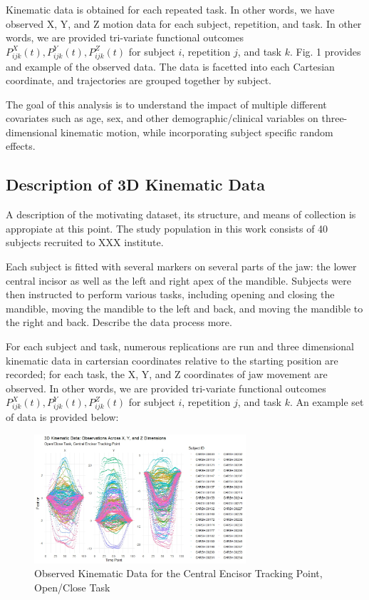 \documentclass[AMA,Times1COL]{WileyNJDv5} %
\begin{document}
Kinematic data is obtained for each repeated task.  In other words, we have observed X, Y, and Z motion data for each subject, repetition, and task.  In other words, we are provided tri-variate functional outcomes \(P_{ijk}^X(t), P_{ijk}^Y(t), P_{ijk}^Z(t)\) for subject \(i\), repetition \(j\), and task \(k\).  Fig. 1 provides and example of the observed data.  The data is facetted into each Cartesian coordinate, and trajectories are grouped together by subject.  

The goal of this analysis is to understand the impact of multiple different covariates such as age, sex, and other demographic/clinical variables on three-dimensional kinematic motion, while incorporating subject specific random effects. 

\subsection{Description of 3D Kinematic Data}

A description of the motivating dataset, its structure, and means of collection is appropiate at this point.  The study population in this work consists of 40 subjects recruited to XXX institute.  

Each subject is fitted with several markers on several parts of the jaw: the lower central incisor as well as the left and right apex of the mandible.  Subjects were then instructed to perform various tasks, including opening and closing the mandible, moving the mandible to the left and back, and moving the mandible to the right and back.  Describe the data process more.

For each subject and task, numerous replications are run and three dimensional kinematic data in cartersian coordinates relative to the starting position are recorded; for each task, the X, Y, and Z coordinates of jaw movement are observed.  In other words, we are provided tri-variate functional outcomes \(P_{ijk}^X(t), P_{ijk}^Y(t), P_{ijk}^Z(t)\) for subject \(i\), repetition \(j\), and task \(k\).  An example set of data is provided below:

\begin{figure}[h]
    \centering
    \includegraphics[width = 0.7\textwidth]{OC_CI_raw.jpeg}
    \caption{Observed Kinematic Data for the Central Encisor Tracking Point, Open/Close Task}
    \label{fig:example_dat}
\end{figure}
\end{document}
